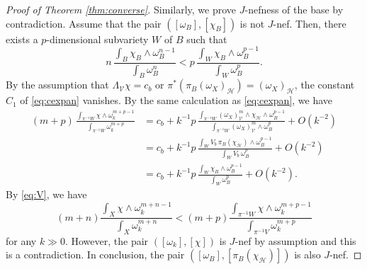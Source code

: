 \documentclass{amsart}
\numberwithin{equation}{section}
\theoremstyle{plain}
\theoremstyle{definition}
\theoremstyle{remark}
\begin{document}
\begin{proof}[Proof of Theorem \ref{thm:converse}]
Similarly, we prove $J$-nefness of the base by contradiction. %
Assume that the pair $\left([\omega_B],[\chi_B]\right)$ is not $J$-nef.
Then, there exists a $p$-dimensional subvariety $W$ of $B$ such that
\begin{equation}\label{eq:V}
n \, \frac{\int_{B} \chi_B \wedge \omega_B^{n-1}}{\int_B \omega_B^n}
<
p \, \frac{\int_W \chi_B \wedge \omega_B^{p-1}}{\int_W \omega_B^p}.
\end{equation}
By the assumption that 
$\Lambda_\mathcal{V} \chi = c_b$ or $\pi^*\left(\pi_B\left(\omega_X\right)_\mathcal{H}\right) = \left(\omega_X\right)_\mathcal{H}$, the constant $C_1$ of \eqref{eq:cexpan} vanishes. 
By the same calculation as \eqref{eq:cexpan}, we have
\begin{align*}
(m+p) \, \frac{\int_{\pi^{-1}W} \chi \wedge \omega_k^{m+p-1}}{\int_{\pi^{-1}W} \omega_k^{m+p}}
&= c_b + k^{-1} p \, \frac{\int_{\pi^{-1}W}\left(\omega_X\right)_\mathcal{V}^m \wedge \chi_\mathcal{H} \wedge \omega_B^{p-1} }{\int_{\pi^{-1}W} \left(\omega_X\right)_\mathcal{V}^m\wedge\omega_B^p} + O\left(k^{-2}\right)\\
&=c_b + k^{-1} p \, \frac{\int_W V_b \, \pi_B\left(\chi_\mathcal{H}\right) \wedge \omega_B^{p-1}}{\int_W V_b \, \omega_B^p} +O\left(k^{-2}\right)\\
&= c_b + k^{-1}p \, \frac{\int_W \chi_B \wedge \omega_B^{p-1}}{\int_W \omega_B^p} + O\left(k^{-2}\right).
\end{align*}
By \eqref{eq:V}, we have
$$ (m+n) \frac{\int_X \chi \wedge \omega_k^{m+n-1}}{\int_X \omega_k^{m+n}}
< 
(m+p)\frac{\int_{\pi^{-1}W} \chi \wedge \omega_k^{m+p-1}}{\int_{\pi^{-1}V} \omega_k^{m+p}}
$$
for any $k \gg 0$.
However, the pair $([\omega_k],[\chi])$ is $J$-nef by assumption and this is a contradiction. 
In conclusion, the pair $([\omega_B],[\pi_B(\chi_\mathcal{H})])$ is also $J$-nef.
\end{proof}
\end{document}
